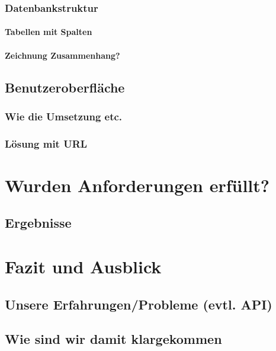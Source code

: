 \documentclass[a4paper,oneside,12pt]{report}
\begin{document}
			\subsection{Datenbankstruktur}
			
				\subsubsection{Tabellen mit Spalten}
				
				\subsubsection{Zeichnung Zusammenhang?}
				
		\section{Benutzeroberfläche}
		
			\subsection{Wie die Umsetzung etc.}
			
			\subsection{Lösung mit URL}
	
	

	\chapter{Wurden Anforderungen erfüllt?}		
	
		\section{Ergebnisse}
		
	

	\chapter{Fazit und Ausblick}
	
		\section{Unsere Erfahrungen/Probleme (evtl. API)}

		\section{Wie sind wir damit klargekommen}
\end{document}
